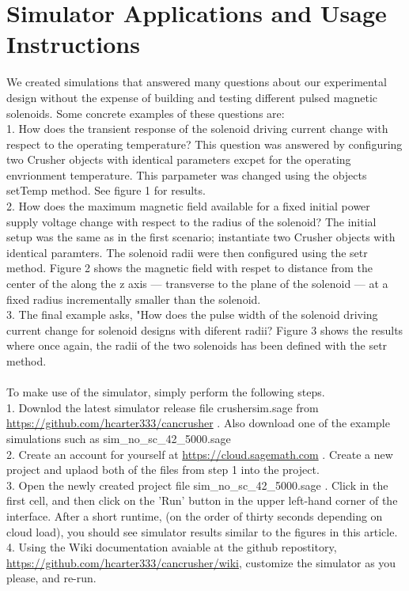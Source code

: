 \documentclass[prb,preprint]{revtex4-1}
\begin{document}
\section{Simulator Applications and Usage Instructions}
We created simulations that answered many questions about our experimental design without the expense of building and testing different pulsed magnetic solenoids.  Some concrete examples of these questions are: 
\\
1.  How does the transient response of the solenoid driving current change with respect to the operating temperature? This question was answered by configuring two Crusher objects with identical parameters excpet for the operating envrionment temperature.  This parpameter was changed using the objects setTemp method.  See figure 1 for results.
\\
2.  How does the maximum magnetic field available for a fixed initial power supply voltage change with respect to the radius of the solenoid? The initial setup was the same as in the first scenario; instantiate two Crusher objects with identical paramters.  The solenoid radii were then configured using the setr method.  Figure 2 shows the magnetic field with respet to distance from the center of the along the z axis --- transverse to the plane of the solenoid --- at a fixed radius incrementally smaller than the solenoid. 
\\
3.  The final example asks, "How does the pulse width  of the solenoid driving current change for solenoid designs with diferent radii? Figure 3 shows the results where once again, the radii of the two solenoids has been defined with the setr method. 
\\
\\
To make use of the simulator, simply perform the following steps.
\\
1.  Downlod the latest simulator release file crushersim.sage from \url{https://github.com/hcarter333/cancrusher} .  Also download one of the example simulations such as sim\_no\_sc\_42\_5000.sage
\\
2.  Create an account for yourself at \url{https://cloud.sagemath.com} .  Create a new project and uplaod both of the files from step 1 into the project.
\\
3.  Open the newly created project file sim\_no\_sc\_42\_5000.sage .  Click in the first cell, and then click on the 'Run' button in the upper left-hand corner of the interface.  After a short runtime, (on the order of thirty seconds depending on cloud load), you should see simulator results similar to the figures in this article.
\\
4.  Using the Wiki documentation avaiable at the github repostitory, \url{https://github.com/hcarter333/cancrusher/wiki}, customize the simulator as you please, and re-run.
\end{document}
